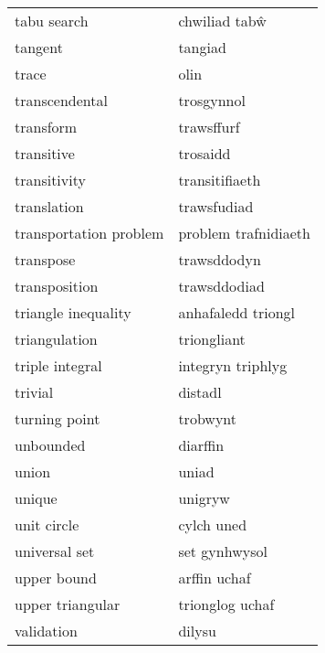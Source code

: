 \begin{supertabular}{p{0.22\textwidth}p{0.22\textwidth}}
                     tabu search &                   chwiliad tabŵ \\
                         tangent &                         tangiad \\
                           trace &                            olin \\
                  transcendental &                      trosgynnol \\
                       transform &                      trawsffurf \\
                      transitive &                        trosaidd \\
                    transitivity &                  transitifiaeth \\
                     translation &                     trawsfudiad \\
          transportation problem &            problem trafnidiaeth \\
                       transpose &                     trawsddodyn \\
                   transposition &                    trawsddodiad \\
             triangle inequality &              anhafaledd triongl \\
                   triangulation &                     triongliant \\
                 triple integral &               integryn triphlyg \\
                         trivial &                         distadl \\
                   turning point &                        trobwynt \\
                       unbounded &                        diarffin \\
                           union &                           uniad \\
                          unique &                         unigryw \\
                     unit circle &                      cylch uned \\
                   universal set &                   set gynhwysol \\
                     upper bound &                    arffin uchaf \\
                upper triangular &                 trionglog uchaf \\
                      validation &                          dilysu \\

\end{supertabular}
